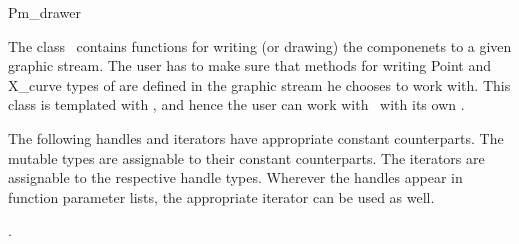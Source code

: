 
\ccRefPageBegin


\begin{ccRefConcept}{Pm_drawer}


\ccDefinition
The class \ccRefName\ contains functions for writing (or drawing) the  componenets to a given graphic stream. 
The user has to make sure that methods for writing Point and X_curve types of  are defined in the graphic stream he chooses to work with.
This class is templated with , and hence the user can work with \ccRefName\ with its own . 
 

\ccTypes

The following handles and iterators have appropriate constant counterparts. The mutable types are assignable to their
constant counterparts. The iterators are assignable to the respective handle types. 
Wherever the handles appear in function parameter lists, the appropriate iterator can be used as well. 

.
\end{ccRefConcept}
